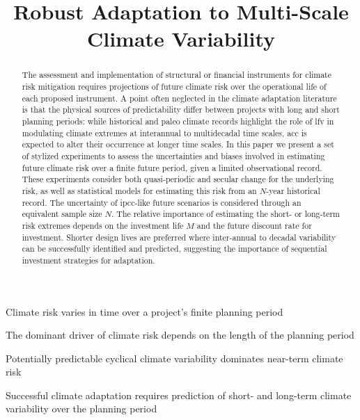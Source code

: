 \documentclass[
  draft,
  linenumbers
]{agujournal2018}
\begin{document}
\title{Robust Adaptation to Multi-Scale Climate Variability}

\begin{keypoints}
  \item Climate risk varies in time over a project's finite planning period
  \item The dominant driver of climate risk depends on the length of the planning period 
  \item Potentially predictable cyclical climate variability dominates near-term climate risk
  \item Successful climate adaptation requires prediction of short- and long-term climate variability over the planning period
\end{keypoints}

\begin{abstract}
  The assessment and implementation of structural or financial instruments for climate risk mitigation requires projections of future climate risk over the operational life of each proposed instrument.
  A point often neglected in the climate adaptation literature is that the physical sources of predictability differ between projects with long and short planning periods: while historical and paleo climate records highlight the role of \acrlong{lfv} in modulating climate extremes at interannual to multidecadal time scales, \acrlong{acc} is expected to alter their occurrence at longer time scales.
  In this paper we present a set of stylized experiments to assess the uncertainties and biases involved in estimating future climate risk over a finite future period, given a limited observational record.
  These experiments consider both quasi-periodic and secular change for the underlying risk, as well as statistical models for estimating this risk from an $N$-year historical record.
  The uncertainty of \acrshort{ipcc}-like future scenarios is considered through an equivalent sample size $N$. 
  The relative importance of estimating the short- or long-term risk extremes depends on the investment life $M$ and the future discount rate for investment.
  Shorter design lives are preferred where inter-annual to decadal variability can be successfully identified and predicted, suggesting the importance of sequential investment strategies for adaptation. 
\end{abstract}
\end{document}
